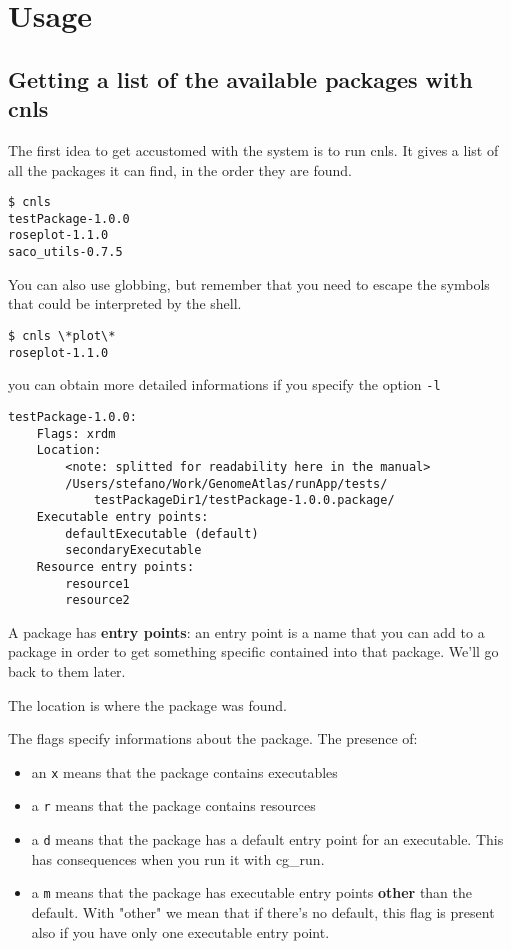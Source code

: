 \section{Usage}

\subsection{Getting a list of the available packages with cnls}

The first idea to get accustomed with the system is to run cnls. It
gives a list of all the packages it can find, in the order they are found.

\begin{verbatim}
$ cnls
testPackage-1.0.0
roseplot-1.1.0
saco_utils-0.7.5
\end{verbatim}

You can also use globbing, but remember that you need to escape the symbols that could be interpreted by the shell.
\begin{verbatim}
$ cnls \*plot\*
roseplot-1.1.0
\end{verbatim}

you can obtain more detailed informations if you specify the option
\verb+-l+

\begin{verbatim}
testPackage-1.0.0:
    Flags: xrdm
    Location: 
        <note: splitted for readability here in the manual>
        /Users/stefano/Work/GenomeAtlas/runApp/tests/
            testPackageDir1/testPackage-1.0.0.package/
    Executable entry points:
        defaultExecutable (default)
        secondaryExecutable 
    Resource entry points:
        resource1
        resource2
\end{verbatim}

A package has \textbf{entry points}: an entry point is a name that you can
add to a package in order to get something specific contained into that
package. We'll go back to them later.

The location is where the package was found.

The flags specify informations about the package. The presence of:
\begin{itemize}
\item an \verb+x+ means that the package contains executables
\item a \verb+r+ means that the package contains resources
\item a \verb+d+ means that the package has a default entry point for an
executable. This has consequences when you run it with cg\_run.
\item a \verb+m+ means that the package has executable entry points
\textbf{other} than the default. With "other" we mean that if there's no
default, this flag is present also if you have only one executable entry
point.
\end{itemize}


